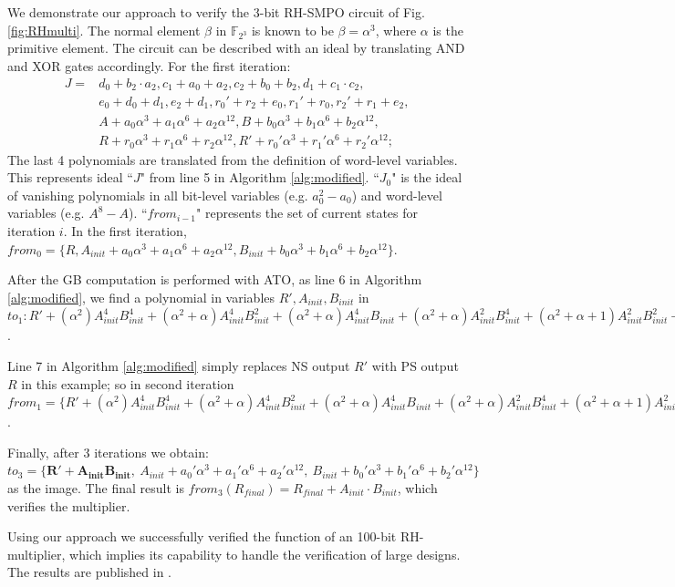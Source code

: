 \begin{example}
\label{ex:RHSMPO}

We demonstrate our approach to verify the 3-bit RH-SMPO circuit of
Fig.\ref{fig:RHmulti}. The normal element $\beta$ in
$\mathbb{F}_{2^3}$ is known to be $\beta = \alpha^3$, where $\alpha$
is the primitive element. The circuit can be described with an ideal by translating
AND and XOR gates accordingly. For the first iteration:
\begin{align*}
J = &d_0+b_2\cdot a_2,
c_1+a_0+a_2,
c_2+b_0+b_2,
d_1+c_1\cdot c_2,\\
&e_0+d_0+d_1,
e_2+d_1,
r_0'+r_2+e_0,
r_1'+r_0,
r_2'+r_1+e_2,\\
&A+a_0\alpha^3+a_1\alpha^6+a_2\alpha^{12},
B+b_0\alpha^3+b_1\alpha^6+b_2\alpha^{12},\\
&R+r_0\alpha^3+r_1\alpha^6+r_2\alpha^{12},
R'+r_0'\alpha^3+r_1'\alpha^6+r_2'\alpha^{12};
\end{align*}
The last 4 polynomials are translated from the definition of word-level variables.
This represents ideal ``$J$" from line 5 in Algorithm
\ref{alg:modified}. ``$J_0$" is the ideal of vanishing polynomials in all bit-level
variables (e.g. $a_0^2-a_0$) and word-level variables (e.g. $A^8-A$). ``$from_{i-1}$"
represents the set of current states for iteration $i$.
In the first iteration, $from_0 = \{R, A_{init}+a_0\alpha^3+a_1\alpha^6+a_2\alpha^{12},
B_{init}+b_0\alpha^3+b_1\alpha^6+b_2\alpha^{12}\}$.

After the GB computation is performed with ATO, as line 6 in Algorithm \ref{alg:modified},
we find a polynomial in variables $R', A_{init}, B_{init}$ in $to_1 : 
R'+(\alpha^2) A_{init}^4 B_{init}^4+(\alpha^2+\alpha) A_{init}^4 B_{init}^2+(\alpha^2+\alpha) A_{init}^4 B_{init}+(\alpha^2+\alpha) A_{init}^2 B_{init}^4+(\alpha^2+\alpha+1) A_{init}^2 B_{init}^2+(\alpha^2) A_{init}^2 B_{init}+(\alpha^2+\alpha) A_{init} B_{init}^4+(\alpha^2) A_{init} B_{init}^2
$.

Line 7 in Algorithm \ref{alg:modified} simply replaces NS output $R'$ with PS output
$R$ in this example; so in second iteration $from_1 = \{
R'+(\alpha^2) A_{init}^4 B_{init}^4+(\alpha^2+\alpha) A_{init}^4 B_{init}^2+(\alpha^2+\alpha) A_{init}^4 B_{init}+(\alpha^2+\alpha) A_{init}^2 B_{init}^4+(\alpha^2+\alpha+1) A_{init}^2 B_{init}^2+(\alpha^2) A_{init}^2 B_{init}+(\alpha^2+\alpha) A_{init} B_{init}^4+(\alpha^2) A_{init} B_{init}^2
, A_{init}+a_2\alpha^3+a_0\alpha^6+a_1\alpha^{12},
B_{init}+b_2\alpha^3+b_0\alpha^6+b_1\alpha^{12}\}$. 

Finally, after 3 iterations we obtain: $to_3 = \{ \mathbf{R'+A_{init}B_{init},}
~A_{init}+a_0'\alpha^3+a_1'\alpha^6+a_2'\alpha^{12},
~B_{init}+b_0'\alpha^3+b_1'\alpha^6+b_2'\alpha^{12}\}$
as the image. The final result is $from_3(R_{final}) = R_{final}+A_{init}\cdot
B_{init}$, which verifies the multiplier. 
\end{example}
Using our approach we successfully verified the function of an 100-bit RH-multiplier,
which implies its capability to handle the verification of large designs. The results
are published in \cite{myDATE}.